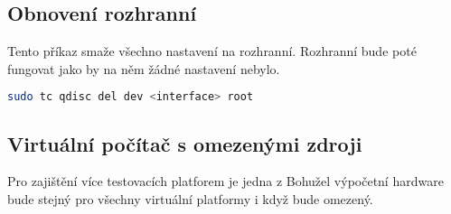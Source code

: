 \subsection*{Obnovení rozhranní}
Tento příkaz smaže všechno nastavení na rozhranní. Rozhranní bude poté fungovat jako by na něm žádné nastavení nebylo.
\begin{lstlisting}[language=bash]
    sudo tc qdisc del dev <interface> root
\end{lstlisting}

\subsection{Virtuální počítač s omezenými zdroji}

Pro zajištění více testovacích platforem je jedna z
Bohužel výpočetní hardware bude stejný pro všechny virtuální platformy i když bude omezený.

\iffalse
\subsection*{Raspberry pi}
\fi